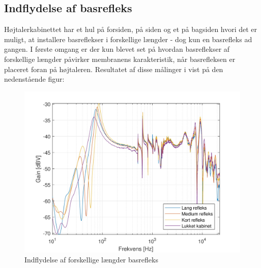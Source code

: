 \subsection{Indflydelse af basrefleks}
Højtalerkabinettet har et hul på forsiden, på siden og et på bagsiden hvori det er muligt, at installere basreflekser i forskellige længder - dog kun en basrefleks ad gangen. I første omgang er der kun blevet set på hvordan basreflekser af forskellige længder påvirker membranens karakteristik, når basrefleksen er placeret foran på højtaleren. Resultatet af disse målinger i vist på den nedenstående figur: 
\begin{figure}[H]
	\centering
	\vspace{-12pt}
	\includegraphics[width=\textwidth]{Pics/BassReflexMembrane}
	\caption{Indflydelse af forskellige længder basrefleks}
\end{figure}


